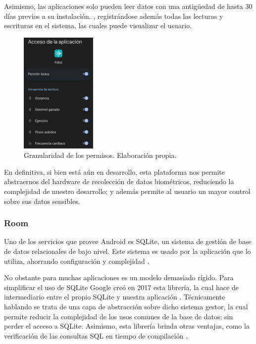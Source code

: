            
            Asimismo, las aplicaciones solo pueden leer datos con una antigüedad de 
            hasta 30 días previos a su instalación. \cite{noauthor_preguntas_nodate}, registrándose además todas las 
            lecturas y escrituras en el sistema, las cuales puede visualizar el usuario. 

            \begin{figure}[h]
                \centering
                \includegraphics[width=0.33\textwidth]{figures/Health connect permisos fitbit.jpg}
                \caption[Granularidad de los permisos.]
                {Granularidad de los permisos. Elaboración propia.}
                \label{figure:health_connect:granularidad_permisos}
            \end{figure}

            En definitiva, si bien está aún en desarrollo, esta plataforma nos permite abstraernos del hardware de
            recolección de datos biométricos, reduciendo la complejidad de nuestro desarrollo; y además permite al 
            usuario un mayor control sobre sus datos sensibles.
            
        \subsubsection{Room}
            Uno de los servicios que provee Android es SQLite, un sistema de gestión de base de datos relacionales de 
            bajo nivel. Este sistema es usado por la aplicación que lo utiliza, ahorrando configuración y complejidad
            \cite{recio_persistencia_2019}. 
            
            No obstante para muchas aplicaciones es un modelo demasiado rígido. Para simplificar el uso de SQLite
            Google creó en 2017 esta librería, la cual hace de intermediario entre el propio SQLite y nuestra 
            aplicación \cite{leiva_room_2020}. Técnicamente hablando se trata de una capa de abstracción sobre dicho
            sistema gestor, la cual permite reducir la complejidad de los usos comunes de la base de datos; sin perder
            el acceso a SQLite. Asimismo, esta librería brinda otras ventajas, como la verificación de las consultas
            SQL en tiempo de compilación \cite{noauthor_como_nodate}.

